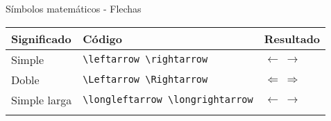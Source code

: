 \documentclass[ignorenonframetext,]{beamer}
\begin{document}
\begin{frame}[fragile]{Símbolos matemáticos - Flechas}
\protect\hypertarget{simbolos-matematicos---flechas}{}

\begin{longtable}[]{@{}lll@{}}
\toprule
\begin{minipage}[b]{0.30\columnwidth}\raggedright
Significado\strut
\end{minipage} & \begin{minipage}[b]{0.30\columnwidth}\raggedright
Código\strut
\end{minipage} & \begin{minipage}[b]{0.30\columnwidth}\raggedright
Resultado\strut
\end{minipage}\tabularnewline
\midrule
\endhead
\begin{minipage}[t]{0.30\columnwidth}\raggedright
Simple\strut
\end{minipage} & \begin{minipage}[t]{0.30\columnwidth}\raggedright
\texttt{\textbackslash{}leftarrow\ \textbackslash{}rightarrow}\strut
\end{minipage} & \begin{minipage}[t]{0.30\columnwidth}\raggedright
\(\leftarrow\ \rightarrow\)\strut
\end{minipage}\tabularnewline
\begin{minipage}[t]{0.30\columnwidth}\raggedright
Doble\strut
\end{minipage} & \begin{minipage}[t]{0.30\columnwidth}\raggedright
\texttt{\textbackslash{}Leftarrow\ \textbackslash{}Rightarrow}\strut
\end{minipage} & \begin{minipage}[t]{0.30\columnwidth}\raggedright
\(\Leftarrow\ \Rightarrow\)\strut
\end{minipage}\tabularnewline
\begin{minipage}[t]{0.30\columnwidth}\raggedright
Simple larga\strut
\end{minipage} & \begin{minipage}[t]{0.30\columnwidth}\raggedright
\texttt{\textbackslash{}longleftarrow\ \textbackslash{}longrightarrow}\strut
\end{minipage} & \begin{minipage}[t]{0.30\columnwidth}\raggedright
\(\longleftarrow\  \longrightarrow\)\strut
\end{minipage}\tabularnewline
\begin{minipage}[t]{0.30\columnwidth}\raggedright

\end{minipage}
\end{longtable}
\end{frame}
\end{document}
